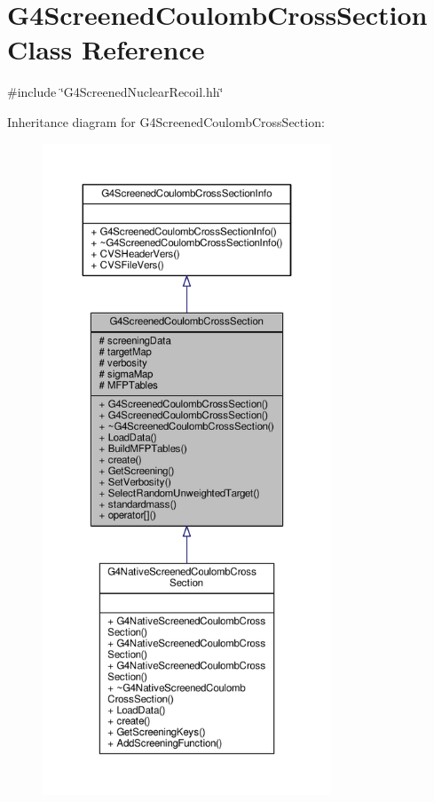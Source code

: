 \hypertarget{classG4ScreenedCoulombCrossSection}{}\section{G4\+Screened\+Coulomb\+Cross\+Section Class Reference}
\label{classG4ScreenedCoulombCrossSection}


{\ttfamily \#include \char`\"{}G4\+Screened\+Nuclear\+Recoil.\+hh\char`\"{}}



Inheritance diagram for G4\+Screened\+Coulomb\+Cross\+Section\+:
\nopagebreak
\begin{figure}[H]
\begin{center}
\leavevmode
\includegraphics[height=550pt]{classG4ScreenedCoulombCrossSection__inherit__graph}
\end{center}
\end{figure}


